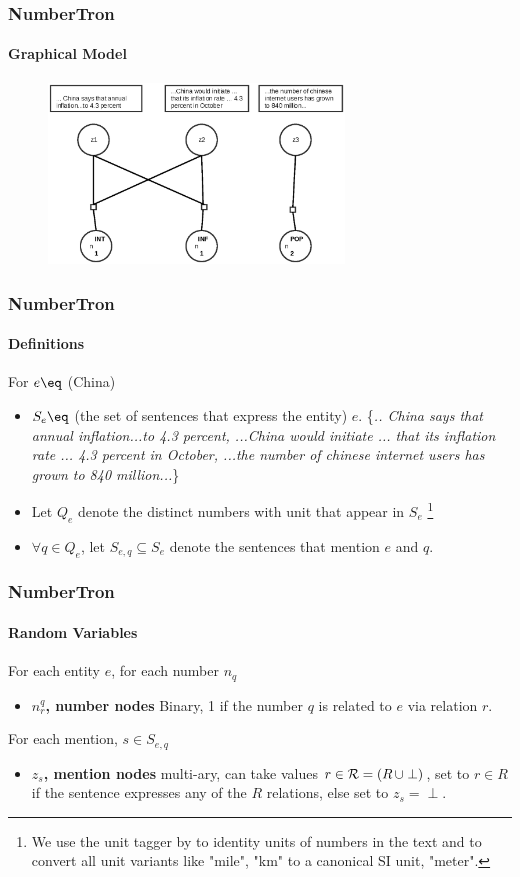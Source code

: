 \documentclass{beamer}
\begin{document}
\begin{frame}
 \frametitle{NumberTron}
\framesubtitle{Graphical Model}
\begin{figure}
\includegraphics[width=0.7\textwidth]{images/numbertronmodel.eps}
\end{figure}

\end{frame}


\begin{frame}
\frametitle{NumberTron}
\framesubtitle{Definitions}
For  $e \eq$ (China)
\begin{itemize}
\setlength \itemsep{1em}
 \item $S_e \eq $ (the set of sentences that express the entity) $e$. 
 \{\textit{\color{blue}.. China says that annual inflation...to 4.3 percent, ...China would initiate ... that its inflation rate ... 4.3 percent in October, ...the number of chinese internet users has grown to 840 million...}\}
 \item Let $Q_e$ denote the distinct numbers with unit that appear in $S_e$ \footnote{We use the unit tagger by \cite{sarawagi2014} to identity units of numbers in the text and to convert all unit variants like "mile", "km" to a canonical SI unit, "meter".}
\item $\forall q \in Q_e$, let $S_{e,q} \subseteq S_e$ denote the sentences that mention $e$ and $q$. 
\end{itemize}
\end{frame}


\begin{frame}
\frametitle{NumberTron}
\framesubtitle{Random Variables}
For each entity $e$, for each number $n_q$
\begin{itemize}
\item \textbf{$n_r^q$, number nodes} Binary, 1 if the number $q$ is related to $e$ via relation $r$. 
\end{itemize}
\vspace{3em}
For each mention, $s \in S_{e,q}$
\begin{itemize}

\item \textbf{$z_s$, mention nodes} multi-ary, can take values $r \in {\cal R} = (R\, \cup \perp)$, set to $r \in R$ if the sentence expresses any of the $R$ relations, else set to $z_s = \perp$.
\end{itemize}
\end{frame}
\end{document}
